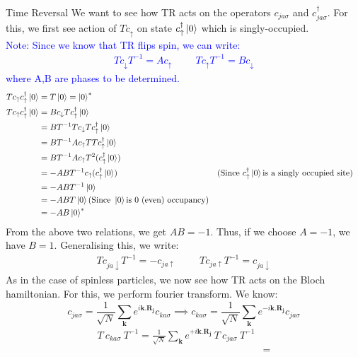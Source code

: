 \documentclass[12pt, oneside, listof=totoc,dvipsnames]{scrbook}
\begin{document}
\begin{chapter}{Time Reversal}
		\noindent
		We want to see how TR acts on the operators $c_{ja\sigma}$ and $c^\dagger_{ja\sigma}$. For this, we first see action of $Tc_\uparrow$ on state $c^\dagger_\uparrow \ket{0}$ which is singly-occupied.\\[0.4cm]
		\textcolor{blue}{Note: Since we know that TR flips spin, we can write: \begin{align*}
				Tc_\downarrow T^{-1}=Ac_\uparrow \hspace{1cm}  Tc_\uparrow T^{-1}=Bc_\downarrow  
			\end{align*} where A,B are phases to be determined.}
		\vspace*{1cm}
		\begin{align*}
			Tc_\uparrow c^\dagger_\uparrow \ket{0} &= T \ket{0} = \ket{0}^* \\ Tc_\uparrow c^\dagger_\uparrow \ket{0} &= Bc_\downarrow T c^\dagger_\uparrow \ket{0}\\ 
			&=B T^{-1} T c_\downarrow T c^\dagger_\uparrow \ket{0}\\
			&=B T^{-1}A c_\uparrow T T c^\dagger_\uparrow \ket{0}\\
			&=B T^{-1}A c_\uparrow T^2 (c^\dagger_\uparrow \ket{0})\\
			&=-AB T^{-1} c_\uparrow (c^\dagger_\uparrow \ket{0}) &&(\text{Since } c^\dagger_\uparrow \ket{0} \text{is a singly occupied site})\\
			&=-AB T^{-1}\ket{0}\\
			&=-ABT\ket{0} (\text{Since } \ket{0} \text{is 0 (even) occupancy})\\
			&=-AB\ket{0}^*
		\end{align*}
		From the above two relations, we get $AB=-1$. Thus, if we choose $A=-1$, we have $B=1$. Generalising this, we write: 
		\begin{align*}
			\boxed{ Tc_{ja\downarrow} T^{-1}=-c_{ja\uparrow} \hspace{1cm}  Tc_{ja\uparrow} T^{-1}=c_{ja\downarrow } }
		\end{align*} 
		As in the case of spinless particles, we now see how TR acts on the Bloch hamiltonian. For this, we perform fourier transform. We know: 
		\[c_{ja\sigma}=\frac{1}{\sqrt{N}} \sum \limits_\mathbf{k}e^{i\mathbf{k.R_j}}c_{ka\sigma} \implies c_{ka\sigma}=\frac{1}{\sqrt{N}} \sum \limits_\mathbf{k}e^{-i\mathbf{k.R_j}}c_{ja\sigma} \]
		\begin{align*}
			T \ c_{ka\sigma}\ T^{-1}= \frac{1}{\sqrt{N}} \sum \limits_\mathbf{k}e^{+i\mathbf{k.R_j}}\ T\ c_{ja\sigma} \ T^{-1}\\
			&=
		\end{align*}
	\end{chapter}
	
\end{document}
